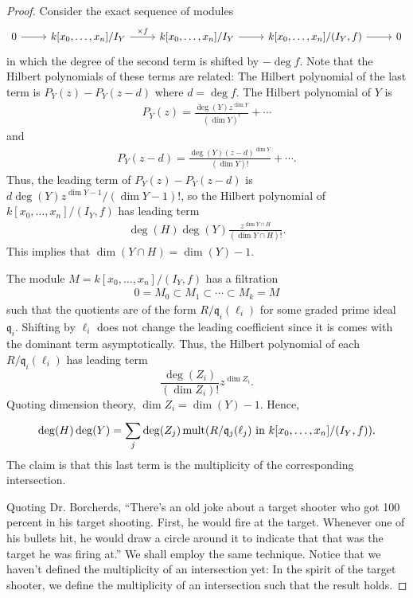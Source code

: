 \documentclass [11 pt, oneside, margin = 1 in] {article}
\begin{document}
\begin{proof}
Consider the exact sequence of modules
\[
\begin{tikzcd}
	0\ar[r] & k[x_0,\hdots,x_n] / I_Y \ar[r, "\times f"] & k[x_0,\hdots, x_n] /I_Y \ar[r] & k[x_0,\hdots, x_n]/(I_Y, f)\ar[r] &0
\end{tikzcd}
\]
in which the degree of the second term is shifted by $-\deg f$. Note that the Hilbert polynomials of these terms are related: The Hilbert polynomial of the last term is $P_Y(z) - P_Y (z-d)$ where $d=\deg f$. The Hilbert polynomial of $Y$ is
\begin{align*}
	P_Y(z) =  \frac{\deg(Y)z^{\dim Y}}{(\dim Y)^!}+\cdots
\end{align*}
and
\begin{align*}
	P_Y(z-d) =  \frac{\deg(Y) (z-d)^{\dim Y}}{(\dim Y)!}+\cdots.
\end{align*}
Thus, the leading term of $P_Y(z)-P_Y (z-d)$ is $d\deg(Y) z^{\dim Y-1}/ (\dim Y- 1)!$, so the Hilbert polynomial of $k[x_0,\hdots,x_n]/(I_Y,f)$ has leading term
\begin{align*}
	\deg(H)\deg (Y)  \frac{z^{\dim Y\cap H}}{(\dim Y\cap H)!}.
\end{align*}
This implies that $\dim (Y\cap H) =\dim (Y)-1$. 

The module $M=k[x_0,\hdots, x_n]/(I_Y, f)$ has a filtration 
\begin{align*}
	0  = M_0\subset M_1\subset\cdots \subset M_k = M
\end{align*}
such that the quotients are of the form $R/\mathfrak{q}_i(\ell_i)$ for some graded prime ideal $\mathfrak{q}_i$. Shifting by $\ell_i$ does not change the leading coefficient since it is comes with the dominant term asymptotically. Thus, the Hilbert polynomial of each $R/\mathfrak{q}_i(\ell_i)$ has leading term 
\[
	\frac{\deg (Z_i)}{(\dim Z_i)!}z^{\dim Z_i}.
\]
Quoting dimension theory, $\dim Z_i = \dim (Y)-1$. Hence, 
\begin{align*}
	\deg(H)\deg (Y) =  \sum_{j}^{} \deg(Z_j) \operatorname{mult} (R/\mathfrak{q}_j(\ell_j) \textrm{ in $k[x_0,\hdots, x_n]/(I_Y,f)$}).
\end{align*}
The claim is that this last term is the multiplicity of the corresponding intersection.

Quoting Dr. Borcherds, ``There's an old joke about a target shooter who got 100 percent in his target shooting. First, he would fire at the target. Whenever one of his bullets hit, he would draw a circle around it to indicate that that was the target he was firing at.'' We shall employ the same technique. Notice that we haven't defined the multiplicity of an intersection yet: In the spirit of the target shooter, we define the multiplicity of an intersection such that the result holds. 
\end{proof}
\end{document}
